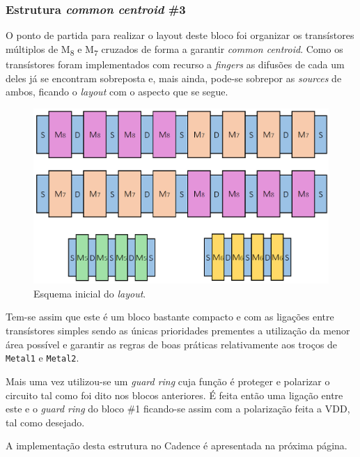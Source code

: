 \documentclass[11pt]{article}
\numberwithin{equation}{section}
\begin{document}
\pagebreak

\subsubsection{Estrutura \textit{common centroid} \#3}

 O ponto de partida para realizar o layout deste bloco foi organizar os transístores múltiplos de M\textsubscript{8} e M\textsubscript{7} cruzados de forma a garantir \textit{common centroid}. Como os transístores foram implementados com recurso a \textit{fingers} as difusões de cada um deles já se encontram sobreposta e, mais ainda, pode-se sobrepor as \textit{sources} de ambos, ficando o \textit{layout} com o aspecto que se segue.
 
\begin{figure}[H]
	\centering
	\includegraphics[keepaspectratio=true, scale=0.35]{teoricas/layout/cc3_1}
	\vspace{-0.5em}
	\caption{Esquema inicial do \textit{layout}.}
	\vspace{-0.8em} 
\end{figure}

Tem-se assim que este é um bloco bastante compacto e com as ligações entre transístores simples sendo as únicas prioridades prementes a utilização da menor área possível e garantir as regras de boas práticas relativamente aos troços de \texttt{Metal1} e \texttt{Metal2}.

Mais uma vez utilizou-se um \textit{guard ring} cuja função é proteger e polarizar o circuito tal como foi dito nos blocos anteriores. É feita então uma ligação entre este e o \textit{guard ring} do bloco \#1 ficando-se assim com a polarização feita a VDD, tal como desejado.

A implementação desta estrutura no Cadence é apresentada na próxima página.
\end{document}
